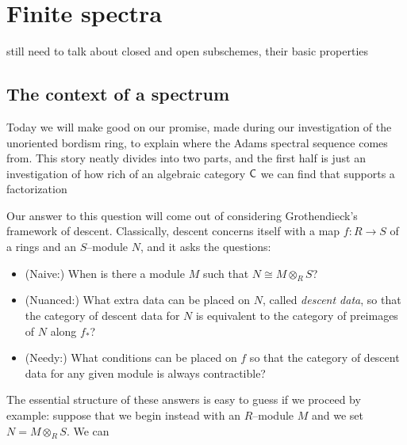 
\chapter{Finite spectra}





still need to talk about closed and open subschemes, their basic properties


\section{The context of a spectrum}\label{StableContextLecture}

Today we will make good on our promise, made during our investigation of the unoriented bordism ring, to explain where the Adams spectral sequence comes from.  This story neatly divides into two parts, and the first half is just an investigation of how rich of an algebraic category $\mathsf{C}$ we can find that supports a factorization
\begin{center}
\end{center}
Our answer to this question will come out of considering Grothendieck's framework of descent.  Classically, descent concerns itself with a map $f: R \to S$ of a rings and an $S$--module $N$, and it asks the questions:
\begin{itemize}
\item (Naive:) When is there a module $M$ such that $N \cong M \otimes_R S$?
\item (Nuanced:) What extra data can be placed on $N$, called \textit{descent data}, so that the category of descent data for $N$ is equivalent to the category of preimages of $N$ along $f_*$?
\item (Needy:) What conditions can be placed on $f$ so that the category of descent data for any given module is always contractible?
\end{itemize}
The essential structure of these answers is easy to guess if we proceed by example: suppose that we begin instead with an $R$--module $M$ and we set $N = M \otimes_R S$.  We can 




